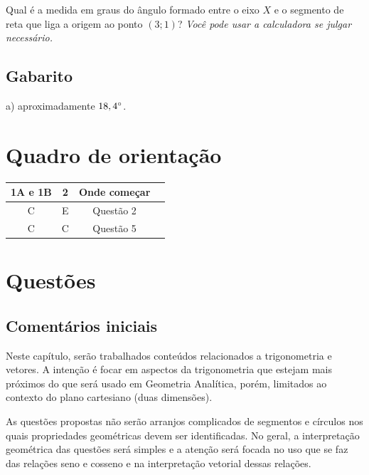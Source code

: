 \documentclass[main.tex]{subfiles}
\begin{document}
\begin{diagnostico}
Qual é a medida em graus do ângulo formado entre o eixo $X$ e o segmento de reta que liga a origem ao ponto $(3;1)$? \textit{Você pode usar a calculadora se julgar necessário.}
\end{diagnostico}

\paraTutores

\subsection{Gabarito}

a) aproximadamente $18,4\degree$.

\section{Quadro de orientação}

\begin{center}
 \begin{tabular}{|c c c |c|} 
 \hline
 1A e 1B & 2 & Onde começar\\
 \hline
 C & E & Questão 2 \\ 
 \hline
 C & C & Questão 5 \\ 
 \hline
\end{tabular}
\end{center}

\paraAmbos

\section{Questões}

\paraTutores

\subsection{Comentários iniciais}

Neste capítulo, serão trabalhados conteúdos relacionados a trigonometria e vetores. A intenção é focar em aspectos da trigonometria que estejam mais próximos do que será usado em Geometria Analítica, porém, limitados ao contexto do plano cartesiano (duas dimensões).

As questões propostas não serão arranjos complicados de segmentos e círculos nos quais propriedades geométricas devem ser identificadas. No geral, a interpretação geométrica das questões será simples e a atenção será focada no uso que se faz das relações seno e cosseno e na interpretação vetorial dessas relações.
\end{document}
